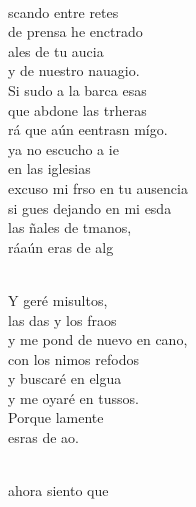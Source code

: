 \documentclass[12pt]{article}
\begin{document}
\begin{multicols*}{2}
\begin{cancion}%
	    \\
	scando entre retes\\
	de prensa he enctrado\\
	ales de tu aucia  \\
	y de nuestro nauagio.\\
	Si sudo a la barca esas\\
	que abdone las trheras\\
	rá que aún eentrasn mígo. \\
	 ya no escucho a ie \\
	en las iglesias\\
	excuso mi frso en tu ausencia\\
	si gues dejando en mi esda\\
	las ñales de tmanos,\\
	ráaún eras de  alg\\\jump\\
	\begin{chorus}%
	Y geré misultos,\\
	las das y los fraos\\
	y me pond de nuevo en cano, \\
	con los nimos refodos\\
	y  buscaré en elgua\\
	y me oyaré en tussos.\\
	Porque lamente   \\
	esras de  ao.\\
	\end{chorus}%
	\jump\\
	ahora siento que \\

\end{cancion}
\end{multicols*}
\end{document}
